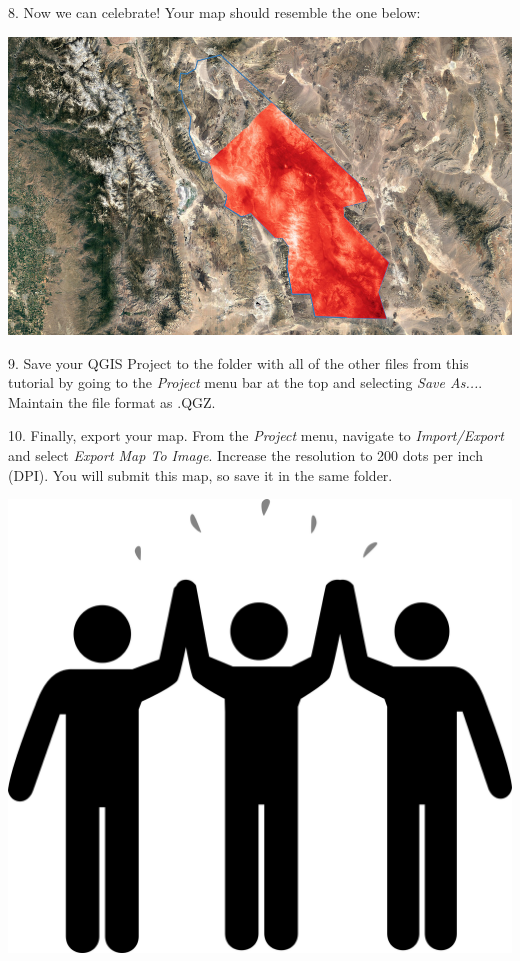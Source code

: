 \documentclass[oneside,a4paper,11pt,explicit]{book}
\begin{document}
\vspace{1em}

8. Now we can celebrate! Your map should resemble the one below:

\vspace{1em}

\centerline{\includegraphics[width=\textwidth]{TempMap1}}

\vspace{1em}


\newpage

9. Save your QGIS Project to the folder with all of the other files from this tutorial by going to the \textit{Project} menu bar at the top and selecting \textit{Save As...}. Maintain the file format as .QGZ.

10. Finally, export your map. From the \textit{Project} menu, navigate to \textit{Import/Export} and select \textit{Export Map To Image}. Increase the resolution to 200 dots per inch (DPI). You will submit this map, so save it in the same folder. 

\vspace{1em}

\centerline{\includegraphics[width=.25\textwidth]{high_five.png}}
\end{document}
